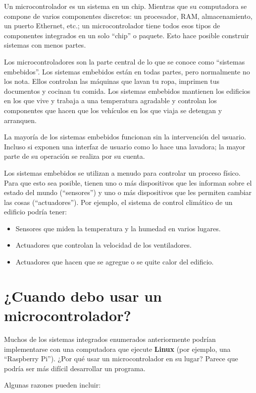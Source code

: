 Un microcontrolador es un sistema en un chip. Mientras que su computadora se compone de varios componentes discretos: un procesador, RAM, almacenamiento, un puerto Ethernet, etc.; un microcontrolador tiene todos esos tipos de componentes integrados en un solo ``chip'' o paquete. Esto hace posible construir sistemas con menos partes.

Los microcontroladores son la parte central de lo que se conoce como ``sistemas embebidos''. Los sistemas embebidos están en todas partes, pero normalmente no los nota. Ellos controlan las máquinas que lavan tu ropa, imprimen tus documentos y cocinan tu comida. Los sistemas embebidos mantienen los edificios en los que vive y trabaja a una temperatura agradable y controlan los componentes que hacen que los vehículos en los que viaja se detengan y arranquen.

La mayoría de los sistemas embebidos funcionan sin la intervención del usuario. Incluso si exponen una interfaz de usuario como lo hace una lavadora; la mayor parte de su operación se realiza por su cuenta.

Los sistemas embebidos se utilizan a menudo para controlar un proceso físico. Para que esto sea posible, tienen uno o más dispositivos que les informan sobre el estado del mundo (``sensores'') y uno o más dispositivos que les permiten cambiar las cosas (``actuadores''). Por ejemplo, el sistema de control climático de un edificio podría tener:

\begin{itemize}
	\item Sensores que miden la temperatura y la humedad en varios lugares.
	\item Actuadores que controlan la velocidad de los ventiladores.
	\item Actuadores que hacen que se agregue o se quite calor del edificio.
\end{itemize}

\section{¿Cuando debo usar un microcontrolador? }

Muchos de los sistemas integrados enumerados anteriormente podrían implementarse con una computadora que ejecute \textbf{Linux} (por ejemplo, una ``Raspberry Pi''). ¿Por qué usar un microcontrolador en su lugar? Parece que podría ser más difícil desarrollar un programa.

Algunas razones pueden incluir:

